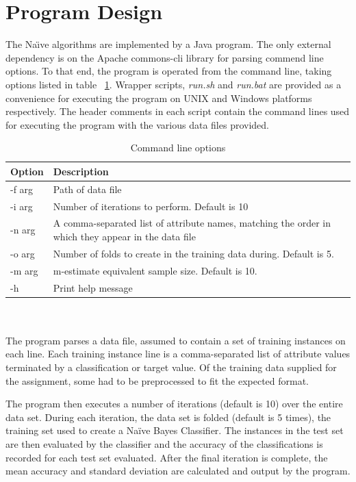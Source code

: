 \documentclass[10pt]{report}
\begin{document}
\section{Program Design}
The Na\"{\i}ve algorithms are implemented by a Java program. The only
external dependency is on the Apache commons-cli library for parsing
commend line options. To that end, the program is operated from the
command line, taking options listed in table
~\ref{tab:commandline}. Wrapper scripts, \textit{run.sh} and
\textit{run.bat} are provided as a convenience for executing the
program on UNIX and Windows platforms respectively. The header
comments in each script contain the command lines used for executing
the program with the various data files provided.
\\
\begin{table}[h]
  \centering
  \begin{tabular}{ |l|p{10cm}|} 
    \hline
    Option & Description \\ \hline
    -f \<arg\>  &  Path of data file \\ \hline
    -i \<arg\>  &  Number of iterations to perform. Default is 10 \\ \hline
    -n \<arg\>  &  A comma-separated list of attribute names, matching
    the order in which they appear in the data file \\ \hline
    -o \<arg\>  &  Number of folds to create in the training data
    during. Default is 5. \\ \hline
    -m \<arg\>  &  m-estimate equivalent sample size. Default is 10. \\ \hline
    -h          &  Print help message \\ \hline
  \end{tabular}
  \caption{Command line options}
  \label{tab:commandline}
\end{table}
\\\\
The program parses a data file, assumed to contain a set of training
instances on each line. Each training instance line is a
comma-separated list of attribute values terminated by a
classification or target value. Of the training data supplied for the
assignment, some had to be preprocessed to fit the expected format.

The program then executes a number of iterations (default is 10) over
the entire data set. During each iteration, the data set is folded
(default is 5 times), the training set used to create a Na\"{i}ve
  Bayes Classifier. The instances in the test set are then evaluated 
  by the classifier and the accuracy of the classifications is
  recorded for each test set evaluated. After the final iteration is
  complete, the mean accuracy and standard deviation are calculated
  and output by the program.
\end{document}
